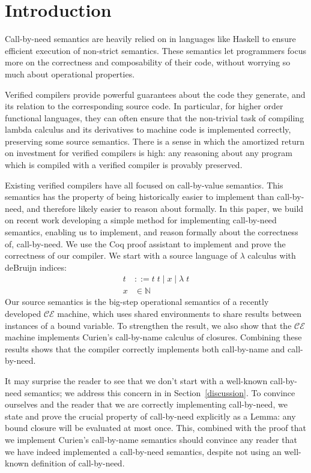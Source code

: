 \section{Introduction}
Call-by-need semantics are heavily relied on in languages like Haskell to ensure
efficient execution of non-strict semantics. These semantics let programmers
focus more on the correctness and composability of their code, without worrying
so much about operational properties. 

Verified compilers provide powerful guarantees about the code they generate, and
its relation to the corresponding source code. In particular, for higher order
functional languages, they can often ensure that the non-trivial task of
compiling lambda calculus and its derivatives to machine code is implemented
correctly, preserving some source semantics. There is a sense in which the
amortized return on investment for verified compilers is high: any reasoning
about any program which is compiled with a verified compiler is provably
preserved. 

Existing verified compilers have all focused on call-by-value semantics. This
semantics has the property of being historically easier to implement than
call-by-need, and therefore likely easier to reason about formally. In this
paper, we build on recent work developing a simple method for implementing
call-by-need semantics, enabling us to implement, and reason formally about the
correctness of, call-by-need. We use the Coq proof assistant \cite{coq} to
implement and prove the correctness of our compiler. We start with a source
language of $\lambda$ calculus with deBruijn indices:
\begin{align*}
 t &::= t \; t \; | \; x \; | \;  \lambda \; t \\
 x &\in \mathbb{N}
\end{align*}
Our source semantics is the big-step operational semantics of a recently
developed $\mathcal{CE}$ machine, which uses shared environments to share
results between instances of a bound variable. To strengthen the result, we also
show that the $\mathcal{CE}$ machine implements Curien's call-by-name calculus
of closures. Combining these results shows that the compiler correctly
implements both call-by-name and call-by-need.

It may surprise the reader to see that we don't start with a well-known
call-by-need semantics; we address this concern in in Section~\ref{discussion}.
To convince ourselves and the reader that we are correctly implementing
call-by-need, we state and prove the crucial property of call-by-need explicitly
as a Lemma: any bound closure will be evaluated at most once. This, combined
with the proof that we implement Curien's call-by-name semantics should convince
any reader that we have indeed implemented a call-by-need semantics, despite not
using an well-known definition of call-by-need. 

